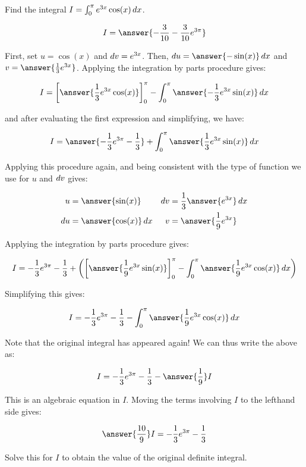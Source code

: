 \documentclass{ximera}
\author{Jim Talamo}
\begin{document}
\begin{exercise}
Find the integral $I = \int_0^{\pi} e^{3x}\cos(x) \mathop{}\!d x $.

\[
I = \answer{-\frac{3}{10}-\frac{3}{10}e^{3 \pi}}
\]

\begin{hint}
First, set $u = \cos(x)$ and $\mathop{}\!d v =  e^{3x}$.  Then, $\d u = \answer{- \sin(x)} \d x$ and $v = \answer{\frac{1}{3}e^{3x}}$.  Applying the integration by parts procedure gives:

\[
I = \eval{\answer{\frac{1}{3}e^{3x}\cos(x)}}_0^{\pi}-\int_0^{\pi} \answer{-\frac{1}{3}e^{3x}\sin(x)} \d x
\] 

and after evaluating the first expression and simplifying, we have:

\[
I = \answer{-\frac{1}{3}e^{3\pi}-\frac{1}{3}}+\int_0^{\pi} \answer{\frac{1}{3}e^{3x}\sin(x)} \d x
\]

\begin{question}
Applying this procedure again, and being consistent with the type of function we use for $u$ and $\mathop{}\!d v$ gives:

\begin{align*}
u  &=  \answer{\sin(x)} & \d v &= \frac{1}{3} \answer{e^{3x}} \d x \\
\d u &= \answer{\cos(x)} \d x & v &= \answer{\frac{1}{9} e^{3x}}
\end{align*}

\begin{question}
Applying the integration by parts procedure gives:

\[
I = -\frac{1}{3}e^{3\pi}-\frac{1}{3}+\left(\eval{\answer{\frac{1}{9}e^{3x}\sin(x)}}_0^{\pi} - \int_0^{\pi} \answer{\frac{1}{9} e^{3x}\cos(x)} \d x \right)
\] 

\begin{question}
Simplifying this gives:

\[
I = -\frac{1}{3}e^{3\pi}-\frac{1}{3}- \int_0^{\pi} \answer{\frac{1}{9} e^{3x}\cos(x)} \d x 
\] 

Note that the original integral has appeared again!  We can thus write the above as:

\[
I = -\frac{1}{3}e^{3\pi}-\frac{1}{3}- \answer{\frac{1}{9}} I
\] 

This is an algebraic equation in $I$.  Moving the terms involving $I$ to the lefthand side gives:

\[
\answer{\frac{10}{9}} I = -\frac{1}{3}e^{3\pi}-\frac{1}{3}
\] 

Solve this for $I$ to obtain the value of the original definite integral.


\end{question}
\end{question}
\end{question}
\end{hint}

\end{exercise}
\end{document}
